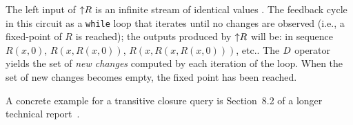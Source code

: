 \begin{algorithm}
\begin{enumerate}
\begin{center}
\end{center}
\end{enumerate}
\end{algorithm}

The left input of ${\uparrow}R$ is an infinite stream of identical values
.  The feedback cycle in this circuit as a
\texttt{while} loop that iterates until no changes are observed (i.e.,
a fixed-point of $R$ is reached); the outputs produced by ${\uparrow}R$
will be: in sequence $R(x,0)$, $R(x,R(x,0))$, $R(x,R(x,R(x,0)))$,
etc..  The $\mathit{D}$ operator yields the set of \emph{new changes} computed
by each iteration of the loop.  When the set of new changes becomes
empty, the fixed point has been reached.

A concrete example for a transitive closure query is Section~8.2 of a
longer technical report~\cite{tr}.

